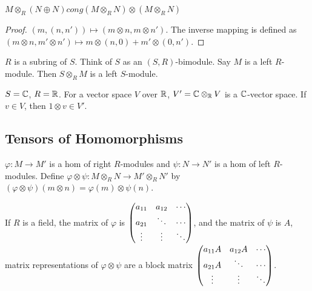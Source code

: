 \documentclass[a4paper,twoside,master.tex]{subfiles}
\begin{document}
\begin{claim}
    $ M \otimes_R(N \oplus N) cong (M \otimes_R N) \otimes (M \otimes_R N) $
\end{claim}
\begin{proof}
    $ (m,(n,n')) \mapsto (m \otimes n, m \otimes n') $. The inverse mapping is defined as $(m \otimes n, m' \otimes n') \mapsto m \otimes (n,0)+ m' \otimes (0,n') $. 
\end{proof}
\begin{ex}
    $ R $ is a subring of $ S $. Think of $ S $ as an $ (S,R) $-bimodule. Say $ M $ is a left $ R $-module. Then $ S \otimes_R M $ is a left $ S $-module.
\end{ex}
\begin{ex}
    $ S = \mathbb{C} $, $ R = \mathbb{R} $. For a vector space $ V $ over $ \mathbb{R} $, $ V' = \mathbb{C} \otimes_{\mathbb{R}} V $ is a $ \mathbb{C} $-vector space. If $ v \in V $, then $ 1\otimes v \in V' $.
\end{ex}

\subsection{Tensors of Homomorphisms}\label{sub:tensors_of_homomorphisms}

$ \varphi \colon M \to M' $ is a hom of right $ R $-modules and $ \psi \colon N \to N' $ is a hom of left $ R $-modules. Define $ \varphi \otimes \psi \colon M \otimes_{R} N \to M' \otimes_R N' $ by $ (\varphi \otimes \psi)(m \otimes n) = \varphi(m) \otimes \psi(n) $.

If $ R $ is a field, the matrix of $ \varphi $ is $ \mqty(a_{11} & a_{12} & \cdots\\a_{21} &\ddots&\cdots\\\vdots&\vdots&\ddots) $, and the matrix of $ \psi $ is $ A $, matrix representations of $ \varphi \otimes \psi $ are a block matrix $ \mqty(a_{11}A & a_{12}A & \cdots\\a_{21}A &\ddots&\cdots\\\vdots&\vdots&\ddots) $. 
\end{document}
